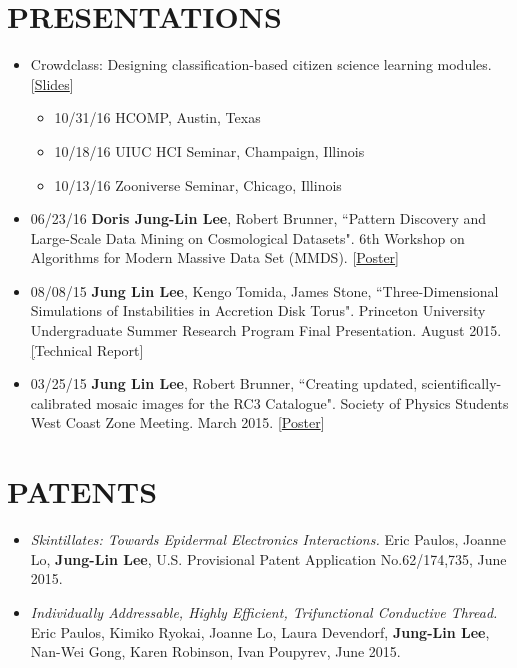 \documentclass{res}
\begin{document}
\begin{resume}
\section{PRESENTATIONS}
\begin{itemize}
\item Crowdclass: Designing classification-based citizen science learning modules. [\href{http://dorisjunglinlee.com/files/crowdclass_slides.pdf}{Slides}]
	\begin{itemize}[label={$\circ$}]
	\item 10/31/16 HCOMP, Austin, Texas
	\item 10/18/16 UIUC HCI Seminar, Champaign, Illinois
	\item 10/13/16 Zooniverse Seminar, Chicago, Illinois
	\end{itemize}
\item 06/23/16 \textbf{Doris Jung-Lin Lee}, Robert Brunner, ``Pattern Discovery and Large-Scale Data Mining on Cosmological Datasets".  6th Workshop on Algorithms for Modern Massive Data Set (MMDS).  [\href{http://dorisjunglinlee.com/files/MMDS_poster.pdf}{Poster}]
\item 08/08/15 \textbf{Jung Lin Lee}, Kengo Tomida, James Stone, ``Three-Dimensional Simulations of Instabilities in Accretion Disk Torus". Princeton University Undergraduate Summer Research Program Final Presentation. August 2015. \href{http ://dorisjunglinlee.com/files/PrincetonUSRPreport.pdf}[{Technical Report}]
\item 03/25/15 \textbf{Jung Lin Lee}, Robert Brunner, ``Creating updated, scientifically-calibrated mosaic images for the RC3 Catalogue". Society of Physics Students West Coast Zone Meeting. March 2015. [\href{http://dorisjunglinlee.com/files/rc3_poster_sps_zone_meeting.pdf}{Poster}]
\end{itemize}
\section{PATENTS}
\begin{itemize}
\item \textit{Skintillates: Towards Epidermal Electronics Interactions.} Eric Paulos, Joanne Lo, \textbf{Jung-Lin Lee}, U.S. Provisional Patent Application No.62/174,735, June 2015.
\item \textit{Individually Addressable, Highly Efficient, Trifunctional Conductive Thread.} Eric Paulos, Kimiko Ryokai, Joanne Lo, Laura Devendorf, \textbf{Jung-Lin Lee}, Nan-Wei Gong, Karen Robinson, Ivan Poupyrev, June 2015.
\end{itemize}

\end{resume}
\end{document}
